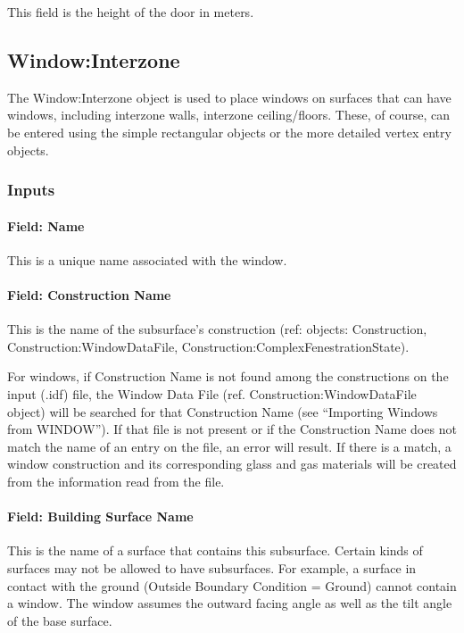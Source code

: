 This field is the height of the door in meters.

\subsection{Window:Interzone}\label{windowinterzone}

The Window:Interzone object is used to place windows on surfaces that can have windows, including interzone walls, interzone ceiling/floors. These, of course, can be entered using the simple rectangular objects or the more detailed vertex entry objects.

\subsubsection{Inputs}\label{inputs-17-010}

\paragraph{Field: Name}\label{field-name-13-011}

This is a unique name associated with the window.

\paragraph{Field: Construction Name}\label{field-construction-name-13}

This is the name of the subsurface's construction (ref: objects: Construction, Construction:WindowDataFile, Construction:ComplexFenestrationState).

For windows, if Construction Name is not found among the constructions on the input (.idf) file, the Window Data File (ref. Construction:WindowDataFile object) will be searched for that Construction Name (see ``Importing Windows from WINDOW''). If that file is not present or if the Construction Name does not match the name of an entry on the file, an error will result. If there is a match, a window construction and its corresponding glass and gas materials will be created from the information read from the file.

\paragraph{Field: Building Surface Name}\label{field-building-surface-name-3}

This is the name of a surface that contains this subsurface. Certain kinds of surfaces may not be allowed to have subsurfaces. For example, a surface in contact with the ground (Outside Boundary Condition = Ground) cannot contain a window. The window assumes the outward facing angle as well as the tilt angle of the base surface.

